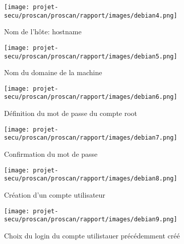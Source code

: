 \documentclass[11pt,a4paper,titlepage, oneside]{article}
\begin{document}
	\newpage
                \begin{figure}[h]
                        \centering
                        \texttt{[image: projet-secu/proscan/proscan/rapport/images/debian4.png]}
                        \caption{Nom de l'hôte: hostname}
                \end{figure}

	 \newpage
                \begin{figure}[h]
                        \centering
                        \texttt{[image: projet-secu/proscan/proscan/rapport/images/debian5.png]}
                        \caption{Nom du domaine de la machine}
                \end{figure}

	 \newpage
                \begin{figure}[h]
                        \centering
                        \texttt{[image: projet-secu/proscan/proscan/rapport/images/debian6.png]}
                        \caption{Définition du mot de passe du compte root}
                \end{figure}


	 \newpage
                \begin{figure}[h]
                        \centering
                        \texttt{[image: projet-secu/proscan/proscan/rapport/images/debian7.png]}
                        \caption{Confirmation du mot de passe}
                \end{figure}

	 \newpage
                \begin{figure}[h]
                        \centering
                        \texttt{[image: projet-secu/proscan/proscan/rapport/images/debian8.png]}
                        \caption{Création d'un compte utilisateur}
                \end{figure}

	 \newpage
                \begin{figure}[h]
                        \centering
                        \texttt{[image: projet-secu/proscan/proscan/rapport/images/debian9.png]}
                        \caption{Choix du login du compte utilistauer précédemment créé}
                \end{figure}
\end{document}
